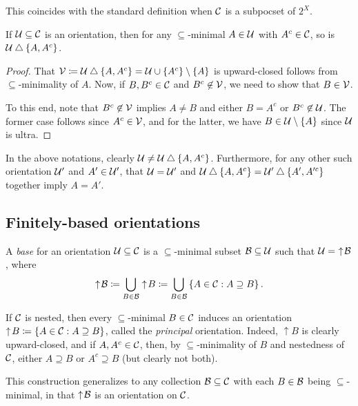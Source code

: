 \documentclass{amsart}
\begin{document}
    \begin{remark}
        This coincides with the standard definition when $\mathcal{C}$ is a subpocset of $2^X$.
    \end{remark}

    \begin{lemma}\label{tree-well-defined}
        If $\mathcal{U}\subseteq\mathcal{C}$ is an orientation, then for any $\subseteq$-minimal $A\in\mathcal{U}$ with $A^c\in\mathcal{C}$, so is $\mathcal{U}\bigtriangleup\left\{A,A^c\right\}$.
    \end{lemma}
    \begin{proof}
        That $\mathcal{V}\coloneqq\mathcal{U}\bigtriangleup\left\{A,A^c\right\}=\mathcal{U}\cup\left\{A^c\right\}\setminus\left\{A\right\}$ is upward-closed follows from $\subseteq$-minimality of $A$. Now, if $B,B^c\in\mathcal{C}$ and $B^c\not\in\mathcal{V}$, we need to show that $B\in\mathcal{V}$.

        To this end, note that $B^c\not\in\mathcal{V}$ implies $A\neq B$ and either $B=A^c$ or $B^c\not\in\mathcal{U}$. The former case follows since $A^c\in\mathcal{V}$, and for the latter, we have $B\in\mathcal{U}\setminus\left\{A\right\}$ since $\mathcal{U}$ is ultra.
    \end{proof}

    \begin{remark}\label{tree-no-loops}
        In the above notations, clearly $\mathcal{U}\neq\mathcal{U}\bigtriangleup\left\{A,A^c\right\}$. Furthermore, for any other such orientation $\mathcal{U}'$ and $A'\in\mathcal{U}'$, that $\mathcal{U}=\mathcal{U}'$ and $\mathcal{U}\bigtriangleup\left\{A,A^c\right\}=\mathcal{U}'\bigtriangleup\left\{A',A'^c\right\}$ together imply $A=A'$.
    \end{remark}

    \subsection{Finitely-based orientations}

    \begin{definition}
        A \textit{base} for an orientation $\mathcal{U}\subseteq\mathcal{C}$ is a $\subseteq$-minimal subset $\mathcal{B}\subseteq\mathcal{U}$ such that $\mathcal{U}=\,\,\uparrow\!\mathcal{B}$, where
        \begin{equation*}
            \uparrow\!\mathcal{B}\coloneqq\bigcup_{B\in\mathcal{B}}\uparrow\!B\coloneqq\bigcup_{B\in\mathcal{B}}\left\{A\in\mathcal{C}: A\supseteq B\right\}.
        \end{equation*}
    \end{definition}

    \begin{remark}
        If $\mathcal{C}$ is nested, then every $\subseteq$-minimal $B\in\mathcal{C}$ induces an orientation $\uparrow\!B\coloneqq\left\{A\in\mathcal{C}: A\supseteq B\right\}$, called the \textit{principal} orientation. Indeed, $\uparrow\!B$ is clearly upward-closed, and if $A,A^c\in\mathcal{C}$, then, by $\subseteq$-minimality of $B$ and nestedness of $\mathcal{C}$, either $A\supseteq B$ or $A^c\supseteq B$ (but clearly not both).

        This construction generalizes to any collection $\mathcal{B}\subseteq\mathcal{C}$ with each $B\in\mathcal{B}$ being $\subseteq$-minimal, in that $\uparrow\!\mathcal{B}$ is an orientation on $\mathcal{C}$.
    \end{remark}
\end{document}
